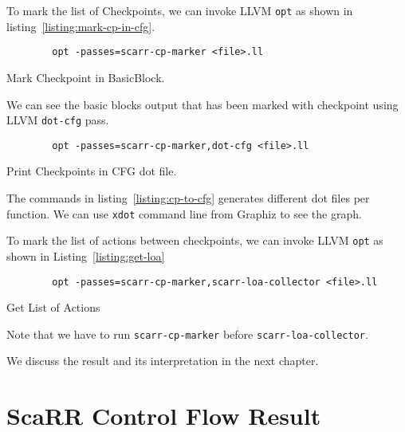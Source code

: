 To mark the list of Checkpoints, we can invoke LLVM \texttt{opt} as shown in
listing~\ref{listing:mark-cp-in-cfg}.

\begin{listing}[ht]
    \begin{verbatim}
        opt -passes=scarr-cp-marker <file>.ll
    \end{verbatim}
    \caption{Mark Checkpoint in BasicBlock.}    
    \label{listing:mark-cp-in-cfg}
\end{listing}

We can see the basic blocks output that has been marked with checkpoint using
LLVM \texttt{dot-cfg} pass.

\begin{listing}[ht]
    \begin{verbatim}
        opt -passes=scarr-cp-marker,dot-cfg <file>.ll
    \end{verbatim}
    \caption{Print Checkpoints in CFG dot file.}    
    \label{listing:cp-to-cfg}
\end{listing}

The commands in listing~\ref{listing:cp-to-cfg} generates different dot files
per function. We can use \texttt{xdot} command line from Graphiz to see the
graph. 

To mark the list of actions between checkpoints, we can invoke LLVM \texttt{opt}
as shown in Listing~\ref{listing:get-loa}

\begin{listing}[ht]
    \begin{verbatim}
        opt -passes=scarr-cp-marker,scarr-loa-collector <file>.ll
    \end{verbatim}
    \caption{Get List of Actions}    
    \label{listing:get-loa}
\end{listing}

Note that we have to run \texttt{scarr-cp-marker} before
\texttt{scarr-loa-collector}.

We discuss the result and its interpretation in the next chapter.

\section{ScaRR Control Flow Result}

